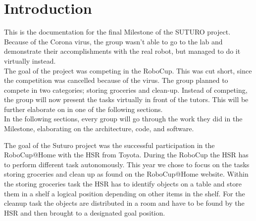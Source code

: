 \documentclass[main.tex]{subfiles}
\begin{document}
	\chapter{Introduction}

This is the documentation for the final Milestone of the SUTURO project. Because of the Corona virus, the group wasn't able to go to the lab and demonstrate their accomplishments with the real robot, but managed to do it virtually instead.\\
The goal of the project was competing in the RoboCup. This was cut short, since the competition was cancelled because of the virus. The group planned to compete in two categories; storing groceries and clean-up. Instead of competing, the group will now present the tasks virtually in front of the tutors. This will be further elaborate on in one of the following sections.\\
In the following sections, every group will go through the work they did in the Milestone, elaborating on the architecture, code, and software.
	
	The goal of the Suturo project was the successful participation in the RoboCup@Home with the HSR from Toyota. During the RoboCup the HSR has to perform different task autonomously. 
	This year we chose to focus on the tasks storing groceries and clean up as found on the RoboCup@Home website. Within the storing groceries task the HSR has to identify objects on a table and store them in a shelf a logical position depending on other items in the shelf. For the cleanup task the objects are distributed in a room and have to be found by the HSR and then brought to a designated goal position.
	
\end{document}
